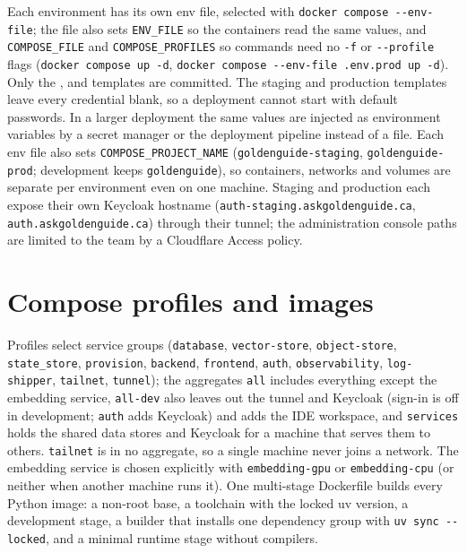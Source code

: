 \documentclass[11pt,letterpaper]{report}
\begin{document}
Each environment has its own env file, selected with \texttt{docker compose -{}-env-file}; the file also sets
\texttt{ENV\_FILE} so the containers read the same values, and \texttt{COMPOSE\_FILE} and
\texttt{COMPOSE\_PROFILES} so commands need no \texttt{-f} or \texttt{-{}-profile} flags
(\texttt{docker compose up -d}, \texttt{docker compose -{}-env-file .env.prod up -d}). Only the ,
 and  templates are committed. The staging and production
templates leave every credential blank, so a deployment cannot start with default passwords. In a larger
deployment the same values are injected as environment variables by a secret manager or the deployment
pipeline instead of a file. Each env file also sets \texttt{COMPOSE\_PROJECT\_NAME}
(\texttt{goldenguide-staging}, \texttt{goldenguide-prod}; development keeps \texttt{goldenguide}), so
containers, networks and volumes are separate per environment even on one machine. Staging and production
each expose their own Keycloak hostname (\texttt{auth-staging.askgoldenguide.ca}, \texttt{auth.askgoldenguide.ca})
through their tunnel; the administration console paths are limited to the team by a Cloudflare Access policy.

\section{Compose profiles and images}
Profiles select service groups (\texttt{database}, \texttt{vector-store}, \texttt{object-store},
\texttt{state\_store}, \texttt{provision}, \texttt{backend}, \texttt{frontend}, \texttt{auth},
\texttt{observability}, \texttt{log-shipper}, \texttt{tailnet}, \texttt{tunnel}); the aggregates
\texttt{all} includes everything except the embedding service, \texttt{all-dev} also leaves out the
tunnel and Keycloak (sign-in is off in development; \texttt{auth} adds Keycloak) and adds the IDE
workspace, and \texttt{services} holds the shared data stores and Keycloak for a machine that serves
them to others. \texttt{tailnet} is in no aggregate, so a single machine never joins a network. The embedding service is
chosen explicitly with \texttt{embedding-gpu} or \texttt{embedding-cpu} (or neither when another machine
runs it). One multi-stage Dockerfile builds every Python image: a non-root base, a toolchain with the
locked uv version, a development stage, a builder that installs one dependency group with
\texttt{uv sync -{}-locked}, and a minimal runtime stage without compilers.
\end{document}

